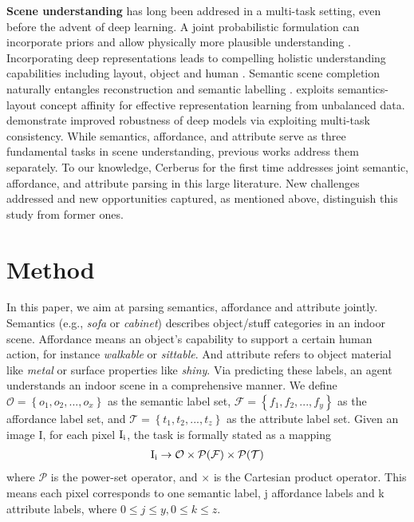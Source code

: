 \documentclass[10pt,twocolumn,letterpaper]{article}
\begin{document}
\textbf{Scene understanding} has long been addresed in a multi-task setting, even before the advent of deep learning. A joint probabilistic formulation can incorporate priors and allow physically more plausible understanding \cite{hedau2010thinking} \cite{schwing2013box}\cite{choi2015indoor}. Incorporating deep representations leads to compelling holistic understanding capabilities including layout, object and human \cite{chen2019holistic++}\cite{nie2020total3dunderstanding}\cite{zhang2021holistic}. Semantic scene completion naturally entangles reconstruction and semantic labelling \cite{song2017semantic}\cite{zhang2018efficient}\cite{zhang2019cascaded}\cite{chen20203d}. \cite{zhao2017physics} exploits semantics-layout concept affinity for effective representation learning from unbalanced data. \cite{zamir2020robust}\cite{mao2020multitask} demonstrate improved robustness of deep models via exploiting multi-task consistency. While semantics, affordance, and attribute serve as three fundamental tasks in scene understanding, previous works\cite{parikh2011relative}\cite{kumar2009attribute}\cite{patterson2012sun}\cite{do2018affordancenet}\cite{sawatzky2017weakly}\cite{shotton2009textonboost}\cite{ladicky2009associative} \cite{krahenbuhl2011efficient}\cite{sawatzky2019object} address them separately. To our knowledge, Cerberus for the first time addresses joint semantic, affordance, and attribute parsing in this large literature. New challenges addressed and new opportunities captured, as mentioned above, distinguish this study from former ones.

\section{Method}

In this paper, we aim at parsing semantics, affordance and attribute jointly. Semantics (e.g., \emph{sofa} or \emph{cabinet}) describes object/stuff categories in an indoor scene. Affordance means an object's capability to support a certain human action, for instance \emph{walkable} or \emph{sittable}. And attribute refers to object material like \emph{metal} or surface properties like \emph{shiny}. Via predicting these labels, an agent understands an indoor scene in a comprehensive manner. We define $\mathcal{O}= \left\{o_1,o_2,...,o_x\right\}$ as the semantic label set, $\mathcal{F} =\left\{f_1,f_2,...,f_{y}\right\}$ as the affordance label set, and $\mathcal{T} = \left\{t_1,t_2,...,t_z\right\}$ as the attribute label set. Given an image I, for each pixel $\rm I_i$, the task is formally stated as a mapping
\begin{align}
\rm I_i \rightarrow \mathcal{O} \times \mathcal{P}(\mathcal{F}) \times \mathcal{P}(\mathcal{T})
\end{align}
where $\mathcal{P}$ is the power-set operator, and $\times$ is the Cartesian product operator. This means each pixel corresponds to one semantic label, j affordance labels and k attribute labels, where $0\leq j\leq y, 0\leq k\leq z$.
\end{document}
